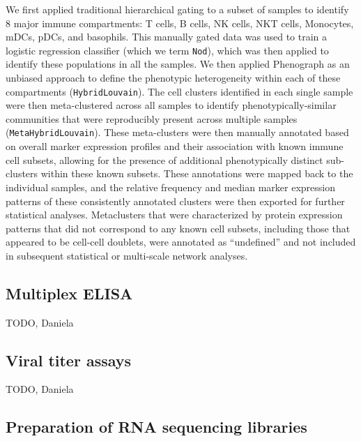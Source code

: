 We first applied traditional hierarchical gating to a subset of samples to identify 8 major immune compartments: T cells, B cells, NK cells, NKT cells, Monocytes, mDCs, pDCs, and basophils. This manually gated data was used to train a logistic regression classifier (which we term \texttt{Nod}), which was then applied to identify these populations in all the samples. We then applied Phenograph\autocite{Levine2015a} as an unbiased approach to define the phenotypic heterogeneity within each of these compartments (\texttt{HybridLouvain}). The cell clusters identified in each single sample were then meta-clustered across all samples to identify phenotypically-similar communities that were reproducibly present across multiple samples (\texttt{MetaHybridLouvain}). These meta-clusters were then manually annotated based on overall marker expression profiles and their association with known immune cell subsets, allowing for the presence of additional phenotypically distinct sub-clusters within these known subsets. These annotations were mapped back to the individual samples, and the relative frequency and median marker expression patterns of these consistently annotated clusters were then exported for further statistical analyses. Metaclusters that were characterized by protein expression patterns that did not correspond to any known cell subsets, including those that appeared to be cell-cell doublets, were annotated as “undefined” and not included in subsequent statistical or multi-scale network analyses.

\subsection{Multiplex ELISA}

TODO, Daniela

\subsection{Viral titer assays}

TODO, Daniela

\subsection{Preparation of RNA sequencing libraries}

